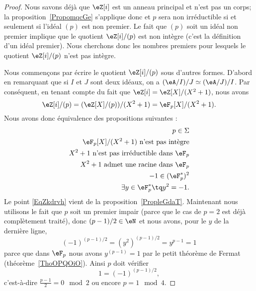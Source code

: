 \begin{proof}
	Nous savons déjà que \( \eZ[i]\) est un anneau principal et n'est pas un corps; la proposition~\ref{PropomqcGe} s'applique donc et \( p\) sera non irréductible si et seulement si l'idéal \( (p)\) est non premier. Le fait que \( (p)\) soit un idéal non premier implique que le quotient \( \eZ[i]/(p)\) est non intègre (c'est la définition d'un idéal premier). Nous cherchons donc les nombres premiers pour lesquels le quotient \( \eZ[i]/(p)\) n'est pas intègre.

	Nous commençons par écrire le quotient \( \eZ[i]/(p)\) sous d'autres formes. D'abord en remarquant que si \( I\) et \( J\) sont deux idéaux, on a \( (\eA/I)/J\simeq (\eA/J)/I\). Par conséquent, en tenant compte du fait que \( \eZ[i]=\eZ[X]/(X^2+1)\), nous avons
	\begin{equation}
		\eZ[i]/(p)=(\eZ[X]/(p))/(X^2+1)=\eF_p[X]/(X^2+1).
	\end{equation}
	Nous avons donc équivalence des propositions suivantes :
	\begin{subequations}
		\begin{align}
			p\in\Sigma                                                       \\
			\eF_p[X]/(X^2+1)\text{ n'est pas intègre}                        \\
			X^2+1\text{ n'est pas irréductible dans } \eF_p \label{EqZkdrvh} \\
			X^2+1\text{ admet une racine dans } \eF_p                        \\
			-1\in (\eF_p^*)^2                                                \\
			\exists y\in \eF_p^*\tq y^2=-1.
		\end{align}
	\end{subequations}
	Le point \eqref{EqZkdrvh} vient de la proposition~\ref{PropleGdaT}. Maintenant nous utilisons le fait que \( p\) soit un premier impair (parce que le cas de \( p=2\) est déjà complètement traité), donc \( (p-1)/2\in \eN\) et nous avons, pour le \( y\) de la dernière ligne,
	\begin{equation}
		(-1)^{(p-1)/2}=(y^2)^{(p-1)/2}=y^{p-1}=1
	\end{equation}
	parce que dans \( \eF_p\) nous avons \( y^{(p-1)}=1\) par le petit théorème de Fermat (théorème~\ref{ThoOPQOiO}). Ainsi \( p\) doit vérifier
	\begin{equation}
		1=(-1)^{(p-1)/2},
	\end{equation}
	c'est-à-dire \( \frac{ p-1 }{2}=0\mod 2\) ou encore \( p=1\mod 4\).
\end{proof}

